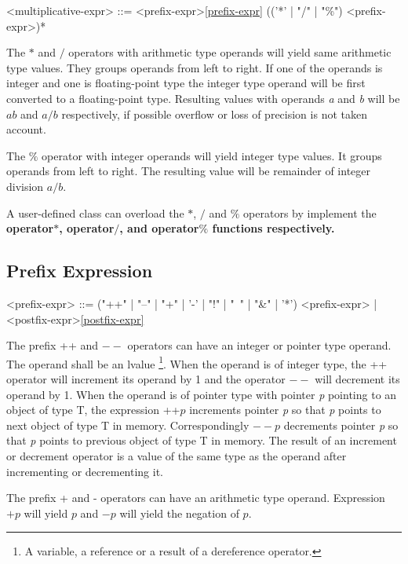 \documentclass[a4paper,oneside,11pt]{article}
\begin{document}
\begin{grammar}
\label{multiplicative-expr}<multiplicative-expr> ::= <prefix-expr>\ref{prefix-expr} (('*' | "/" | "\%") <prefix-expr>)*
\end{grammar}

The $*$ and $/$ operators with arithmetic type operands will yield same arithmetic type values. They groups operands from left to right.
If one of the operands is integer and one is floating-point type the integer type operand will be first converted to a floating-point type.
Resulting values with operands \emph{a} and \emph{b} will be $a b$ and $a / b$ respectively,
if possible overflow or loss of precision is not taken account.

The $\%$ operator with integer operands will yield integer type values. It groups operands from left to right.
The resulting value will be remainder of integer division $a / b$.

A user-defined class can overload the $*$, $/$ and $\%$ operators by implement the \bf{operator$*$}, \bf{operator$/$}, and \bf{operator$\%$}
functions respectively.

\subsection{Prefix Expression}

\begin{grammar}
\label{prefix-expr}<prefix-expr> ::= ("++" | "--" | "+" | '-' | "!" | "~" | "\&" | '*') <prefix-expr> | <postfix-expr>\ref{postfix-expr}
\end{grammar}

The prefix ++ and $--$ operators can have an integer or pointer type operand.
The operand shall be an lvalue \footnote{A variable, a reference or a result of a dereference operator.}.
When the operand is of integer type, the ++ operator will increment its operand by 1 and the operator $--$ will decrement its operand by 1.
When the operand is of pointer type with pointer \emph{p} pointing to an object of type T,
the expression ++$p$ increments pointer \emph{p} so that \emph{p} points to next object of type T in memory.
Correspondingly $--p$ decrements pointer \emph{p} so that \emph{p} points to previous object of type T in memory.
The result of an increment or decrement operator is a value of the same type as the operand after incrementing or decrementing it.

The prefix + and - operators can have an arithmetic type operand.
Expression $+p$ will yield $p$ and $-p$ will yield the negation of $p$.
\end{document}
